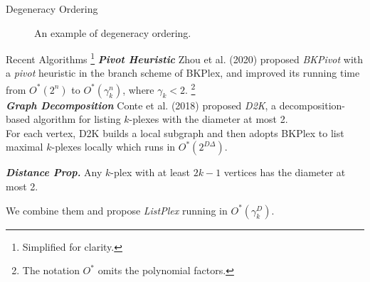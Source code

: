 \documentclass[9pt]{beamer} %
\begin{document}
\begin{frame}{Degeneracy Ordering}
\begin{figure}
{\begin{center}
            \end{center}
        }
        \caption{An example of degeneracy ordering.}
    \end{figure}
\end{frame}
\begin{frame}{Recent Algorithms  \footnote{Simplified for clarity.}}
    \textbf{\emph{Pivot Heuristic}} Zhou et al. (2020) proposed \emph{BKPivot} with a \emph{pivot} heuristic in the branch scheme of BKPlex, and improved its running time from $O^*(2^n)$ to $O^*(\gamma_k^n)$, where $\gamma_k<2$. \footnote{The notation $O^*$ omits the polynomial factors.}\\
    \vspace{0.5cm}    
    \textbf{\emph{Graph Decomposition}} Conte et al. (2018) proposed \emph{D2K}, a decomposition-based algorithm for listing $k$-plexes with the diameter at most 2.\\
    For each vertex, D2K builds a local subgraph and then adopts BKPlex to list maximal $k$-plexes locally which runs in $O^*(2^{D\Delta})$.\\
    \vspace{0.25cm}
    \begin{flushright}
        \footnotesize \textbf{\emph{Distance Prop.}} Any $k$-plex with at least $2k-1$ vertices has the diameter at most 2.
    \end{flushright}
    \pause
    \vspace{0.5cm}
    \begin{center}
        We combine them and propose \emph{ListPlex} running in $O^*(\gamma_k^D)$.
    \end{center}
\end{frame}
\end{document}
